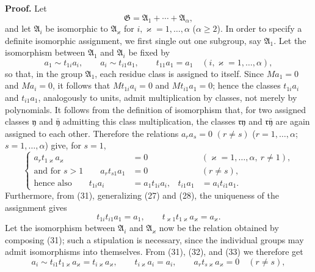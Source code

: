 \documentclass[11pt]{article}
\begin{document}
\textbf{Proof.} Let
\[
  \mathfrak G=\mathfrak A_1+\cdots+\mathfrak A_\alpha,
\]
and let $\mathfrak A_i$ be isomorphic to $\mathfrak A_\varkappa$ for $i,\varkappa=1,
\ldots,\alpha$ ($\alpha\ge2$). In order to specify a definite isomorphic assignment, we first single out one subgroup, say $\mathfrak A_1$. Let the isomorphism between $\mathfrak A_1$ and $\mathfrak A_i$ be fixed by
\begin{equation}
 a_1\sim t_{1i}a_i,
 \qquad
 a_i\sim t_{i1}a_1,
 \qquad
 t_{11}a_1=a_1
 \quad(i,\varkappa=1,
\ldots,\alpha),
\tag{31}
\end{equation}
so that, in the group $\mathfrak A_1$, each residue class is assigned to itself. Since $Ma_1=0$ and $Ma_i=0$, it follows that $Mt_{1i}a_i=0$ and $Mt_{i1}a_1=0$; hence the classes $t_{1i}a_i$ and $t_{i1}a_1$, analogously to units, admit multiplication by classes, not merely by polynomials. It follows from the definition of isomorphism that, for two assigned classes $\mathfrak y$ and $\bar{\mathfrak y}$ admitting this class multiplication, the classes $\mathfrak r\mathfrak y$ and $\mathfrak r\bar{\mathfrak y}$ are again assigned to each other. Therefore the relations $a_ra_s=0$ $(r\ne s)$ ($r=1,
\ldots,
\alpha$; $s=1,
\ldots,
\alpha$) give, for $s=1$,
\begin{equation}
\left\{
\begin{aligned}
 a_r t_{1\varkappa}a_\varkappa&=0 &&(\varkappa=1,
\ldots,
\alpha,
\ r\ne1),\\
 \text{and for }s>1\qquad a_r t_{s1}a_1&=0 &&(r\ne s),\\
 \text{hence also}\qquad t_{1i}a_i&=a_1t_{1i}a_i,
 &t_{i1}a_1&=a_it_{i1}a_1.
\end{aligned}\right.
\tag{32}
\end{equation}
Furthermore, from (31), generalizing (27) and (28), the uniqueness of the assignment gives
\begin{equation}
 t_{1i}t_{i1}a_1=a_1,
 \qquad
 t_{\varkappa1}t_{1\varkappa}a_\varkappa=a_\varkappa.
\tag{33}
\end{equation}
Let the isomorphism between $\mathfrak A_i$ and $\mathfrak A_\varkappa$ now be the relation obtained by composing (31); such a stipulation is necessary, since the individual groups may admit isomorphisms into themselves. From (31), (32), and (33) we therefore get
\begin{equation}
 a_i\sim t_{i1}t_{1\varkappa}a_\varkappa=t_{i\varkappa}a_\varkappa,
 \qquad
 t_{i\varkappa}a_i=a_i,
 \qquad
 a_rt_{s\varkappa}a_\varkappa=0\quad(r\ne s),
\tag{34}
\end{equation}
\end{document}
